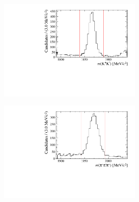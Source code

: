 \begin{figure}[!h]
\begin{subfigure}[t]{1.0\textwidth}
   \end{subfigure}   
   \begin{subfigure}[t]{1.0\textwidth}
   \centering
     \begin{subfigure}[t]{0.35\textwidth}
        \centering
        \includegraphics[width=1.0\textwidth]{figs/Selection/Phimass_PiPiPi_B2DsD0.pdf}
     \end{subfigure}
     \begin{subfigure}[t]{0.35\textwidth}
        \centering
        \includegraphics[width=1.0\textwidth]{figs/Selection/Dmass_PiPiPi_B2DsD0.pdf}
     \end{subfigure}
     \caption{\decay{\Bp}{(\decay{\Dsp}{\pip\pim\pip})\Dzb}}
   \end{subfigure}   
   \begin{subfigure}[t]{1.0\textwidth}

\end{subfigure}
\end{figure}
